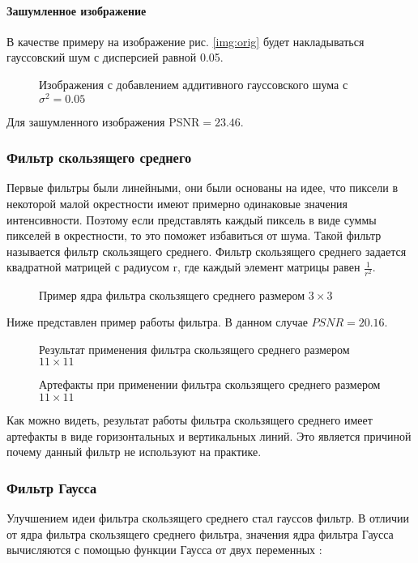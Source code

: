 \paragraph{Зашумленное изображение}
В качестве примеру на изображение рис. \ref{img:orig} будет накладываться гауссовский шум  с дисперсией равной  0.05.
\begin{figure}[H]\label{img:noised}
	\caption{Изображения с добавлением аддитивного гауссовского шума с $\sigma^2=0.05$}
\end{figure}
Для зашумленного изображения PSNR$=23.46$.
\subsubsection{Фильтр скользящего среднего}
Первые фильтры были линейными, они были основаны на идее, что пиксели в некоторой малой окрестности имеют примерно одинаковые значения интенсивности. Поэтому если представлять каждый пиксель в виде суммы пикселей в окрестности, то это поможет избавиться от шума. Такой фильтр называется фильтр скользящего среднего. Фильтр скользящего среднего задается квадратной матрицей с радиусом r, где каждый элемент матрицы равен $\frac{1}{r^2}$.
\begin{figure}[H]
	\label{img:kernelBox}
	\caption{Пример ядра фильтра скользящего среднего размером $3\times 3$}
\end{figure}
Ниже представлен пример работы фильтра. В данном случае $PSNR=20.16$.
\begin{figure}[H]
	\caption{Результат применения фильтра скользящего среднего размером $11\times 11$}
\end{figure}
\begin{figure}[H]
	\caption{Артефакты при применении фильтра скользящего среднего размером $11\times 11$}
\end{figure}
Как можно видеть, результат работы  фильтра скользящего среднего имеет артефакты в виде горизонтальных и вертикальных линий. Это является причиной почему данный фильтр не используют на практике.
\subsubsection{Фильтр Гаусса}
Улучшением идеи  фильтра скользящего среднего стал гауссов фильтр. В отличии от ядра  фильтра скользящего среднего фильтра, значения ядра фильтра Гаусса вычисляются с помощью функции Гаусса от двух переменных :

